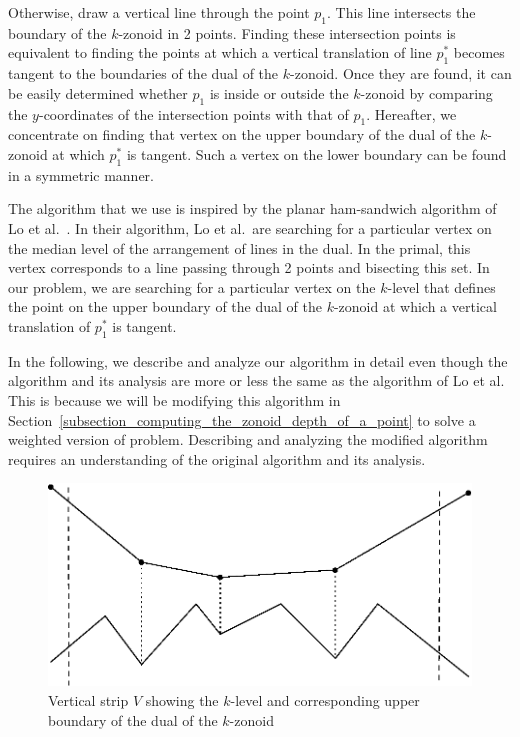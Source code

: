 \documentclass{elsart}
\begin{document}
Otherwise, draw a vertical line through the point $p_1$. This line
intersects the boundary of the $k$-zonoid in 2 points.  Finding these
intersection points is equivalent to finding the points at which a
vertical translation of line $p_1^*$ becomes tangent to the boundaries
of the dual of the $k$-zonoid. Once they are found, it can be easily
determined whether $p_1$ is inside or outside the $k$-zonoid by
comparing the $y$-coordinates of the intersection points with that of
$p_1$.  Hereafter, we concentrate on finding that vertex on the upper
boundary of the dual of the $k$-zonoid at which $p_1^*$ is tangent.
Such a vertex on the lower boundary can be found in a symmetric
manner. 

The algorithm that we use is inspired by the planar ham-sandwich
algorithm of Lo et al.\ \cite{algorithms_for_ham_sandwich_cuts}. In
their algorithm, Lo et al.\ are searching for a particular vertex on
the median level of the arrangement of lines in the dual. In the
primal, this vertex corresponds to a line passing through 2 points and
bisecting this set. In our problem, we are searching for a particular
vertex on the $k$-level that defines the point on the upper boundary
of the dual of the $k$-zonoid at which a vertical translation of
$p_1^*$ is tangent.

In the following, we describe and analyze our algorithm in detail even
though the algorithm and its analysis are more or less the same as the
algorithm of Lo et al.  This is because we will be modifying this
algorithm in
Section~\ref{subsection_computing_the_zonoid_depth_of_a_point} to
solve a weighted version of problem.  Describing and analyzing the
modified algorithm requires an understanding of the original algorithm
and its analysis.

\begin{figure}
 \begin{center} 
   \includegraphics{fig5}
   \caption{\label{fig_vertical_strip}Vertical strip $V$ showing the $k$-level and corresponding upper boundary of the dual of the $k$-zonoid}
 \end{center}
\end{figure}
\end{document}
